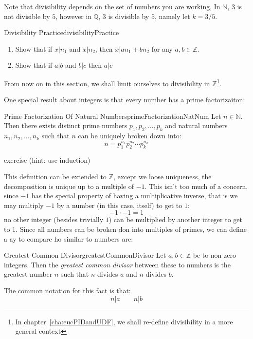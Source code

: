 \documentclass{book}
\newcommand{\N}{{\mathbb{N}}}
\newcommand{\Q}{{\mathbb{Q}}}
\newcommand{\Z}{{\mathbb{Z}}}
\renewcommand{\mid}{\big|}
\begin{document}
Note that divisibility depends on the set of numbers you are working, In $\N$, $3$ is not divisible by $5$,
however in $\Q$, $3$ is divisible by $5$, namely let $k = 3/5$.

\begin{example}{Divisibility Practice}{divisibilityPractice}
	\begin{enumerate}
		\item Show that if $x \mid n_1$ and $ x\mid n_2$, then $x \mid an_1 + bn_2$ for any $a,b \in \Z$.
		\item Show that if $a \mid b$ and $b \mid c$ then $a \mid c$
	\end{enumerate}
\end{example}

From now on in this section, we shall limit ourselves to divisibility in $\Z$\footnote{In
chapter~\ref{cha:eucPIDandUDF}, we shall re-define divisibility in a more general context}.

One special result about integers is that every number has a prime factorizaiton:

\begin{prop}{Prime Factorization Of Natural Numbers}{primeFactorizationNatNum}
	Let $n \in \N$. Then there exists distinct prime numbers $p_1, p_2, ..., p_k$ and natural numbers $n_1,
	n_2, ..., n_k$ such that $n$ can be uniquely broken down into:
\[
	n = p_{1}^{n_1}p_{2}^{n_2}\cdots p_{k}^{n_k}
\]
\end{prop}

\begin{Proof}
	exercise (hint: use induction)
\end{Proof}

This definition can be extended to $\Z$, except we loose uniqueness, the decomposition is unique up to
a multiple of $-1$. This isn't too much of a concern, since $-1$ has the special property of having
a multiplicative inverse, that is we may multiply $-1$ by a number (in this case, itself) to get to $1$:
\[
	-1\cdot -1 = 1
\]
no other integer (besides trivially $1$) can be multiplied by another integer to get to $1$. Since all numbers
can be broken don into multiples of primes, we can define a ay to compare ho similar to numbers are:

\begin{defn}{Greatest Common Divisor}{greatestCommonDivisor}
	Let $a,b \in \Z$ be to non-zero integers. Then the \emph{greatest common divisor} between these to numbers is the
	greatest number $n$ such that $n$ divides $a$ and $n$ divides $b$.

	The common notation for this fact is that:
	\[
		n \mid a \qquad n \mid b
	\]
\end{defn}
\end{document}
